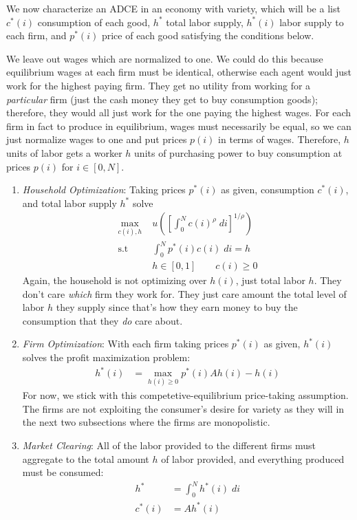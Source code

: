 \documentclass[12pt]{article}
\theoremstyle{plain}
\theoremstyle{definition}
\theoremstyle{remark}
\newcommand{\intzN}{\int_0^N}
\begin{document}
We now characterize an ADCE in an economy with variety, which will be a list
$c^*(i)$ consumption of each good, $h^*$ total labor supply, $h^*(i)$
labor supply to each firm, and $p^*(i)$ price of each good
satisfying the conditions below.

We leave out wages which are normalized to one. We could do this because
equilibrium wages at each firm must be identical, otherwise each agent
would just work for the highest paying firm. They get no utility from
working for a \emph{particular} firm (just the cash money they get to
buy consumption goods); therefore, they would all just work for the one
paying the highest wages. For each firm in fact to produce in
equilibrium, wages must necessarily be equal, so we can just normalize
wages to one and put prices $p(i)$ in terms of wages. Therefore, $h$
units of labor gets a worker $h$ units of purchasing power to buy
consumption at prices $p(i)$ for $i\in[0,N]$.
\begin{enumerate}
  \item \emph{Household Optimization}: Taking prices $p^*(i)$ as given,
    consumption $c^*(i)$, and total labor supply $h^*$ solve
    \begin{align*}
      \max_{c(i), h}
        & \; u\left(
          \left[ \int_0^N c(i)^\rho \; di \right]^{1/\rho}
        \right)\\
      \text{s.t} & \;
        \intzN p^*(i) c(i) \; di= h \\
      &\; h\in[0,1]
      \qquad c(i) \geq 0
    \end{align*}
    Again, the household is not optimizing over $h(i)$, just total labor
    $h$. They don't care \emph{which} firm they work for. They just care
    amount the total level of labor $h$ they supply since that's how
    they earn money to buy the consumption that they \emph{do} care
    about.

  \item \emph{Firm Optimization}: With each firm taking prices $p^*(i)$
    as given, $h^*(i)$ solves the profit maximization problem:
    \begin{align*}
      h^*(i)
      &=
      \max_{h(i)\geq 0}
      p^*(i) Ah(i) - h(i)
    \end{align*}
    For now, we stick with this competetive-equilibrium price-taking
    assumption. The firms are not exploiting the consumer's desire for
    variety as they will in the next two subsections where the firms are
    monopolistic.

  \item \emph{Market Clearing}: All of the labor provided to the
    different firms must aggregate to the total amount $h$ of labor
    provided, and everything produced must be consumed:
    \begin{align*}
       h^* &= \intzN h^*(i) \; di \\
       c^*(i) &= Ah^*(i)
    \end{align*}
\end{enumerate}
\end{document}
